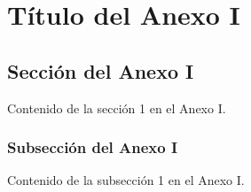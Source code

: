 \chapter{Título del Anexo I}

\section{Sección del Anexo I}
Contenido de la sección 1 en el Anexo I.

\subsection{Subsección del Anexo I}
Contenido de la subsección 1 en el Anexo I.
